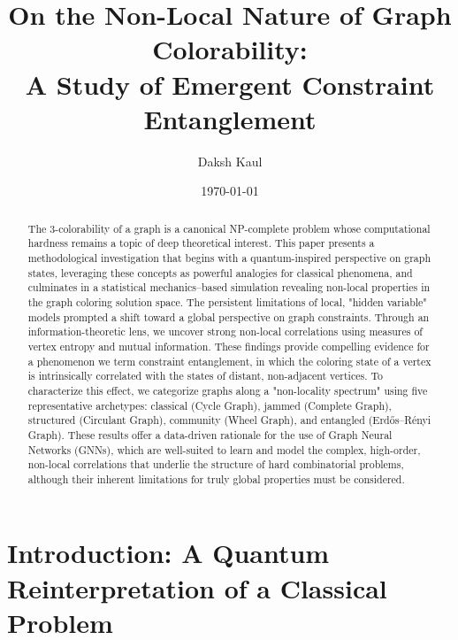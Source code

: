 \documentclass[12pt, letterpaper]{article}
\title{On the Non-Local Nature of Graph Colorability:\\A Study of Emergent Constraint Entanglement}
\author{Daksh Kaul}
\date{\today}
\begin{document}
\maketitle

\begin{abstract}
The 3-colorability of a graph is a canonical NP-complete problem whose computational hardness remains a topic of deep theoretical interest.
This paper presents a methodological investigation that begins with a quantum-inspired perspective on graph states, leveraging these concepts as powerful analogies for classical phenomena, and culminates in a statistical mechanics–based simulation revealing non-local properties in the graph coloring solution space.
The persistent limitations of local, "hidden variable" models prompted a shift toward a global perspective on graph constraints.
Through an information-theoretic lens, we uncover strong non-local correlations using measures of vertex entropy and mutual information.
These findings provide compelling evidence for a phenomenon we term constraint entanglement, in which the coloring state of a vertex is intrinsically correlated with the states of distant, non-adjacent vertices.
To characterize this effect, we categorize graphs along a "non-locality spectrum" using five representative archetypes: classical (Cycle Graph), jammed (Complete Graph), structured (Circulant Graph), community (Wheel Graph), and entangled (Erdős–Rényi Graph).
These results offer a data-driven rationale for the use of Graph Neural Networks (GNNs), which are well-suited to learn and model the complex, high-order, non-local correlations that underlie the structure of hard combinatorial problems, although their inherent limitations for truly global properties must be considered.
\end{abstract}

\section{Introduction: A Quantum Reinterpretation of a Classical Problem}
\end{document}
